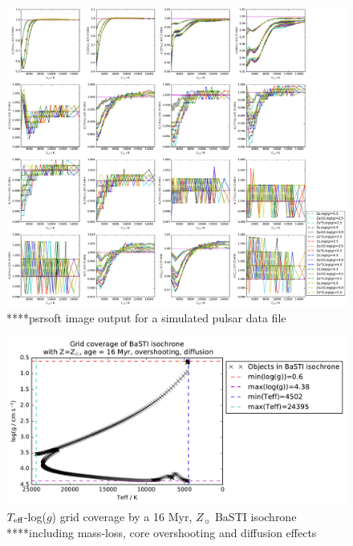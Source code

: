\documentclass[usenatbib]{mnras}
\begin{document}
\begin{figure}
\begin{center}
\includegraphics[scale=0.3]{../Aall_ratio_Zs_div_Z2_effect_high_logg_zoom_15000.pdf}
\caption{****psrsoft image output for a simulated pulsar data file}
\label{all_Z_Z2_ratio}
\end{center}
\end{figure}

\begin{figure}
\includegraphics[scale=0.4]{../wfc3_16_23Myr_10Gyr_complex_solar/wfc3_ATLAS9_grid_BaSTI_coverage_c16_complex_Zsol_4500.pdf}
\caption{$T_{\textnormal{eff}}$-log($g$) grid coverage by a 16 Myr, $Z_{\sun}$ BaSTI isochrone ****including mass-loss, core overshooting and diffusion effects}
\label{BaSTI_coverage_16M}
\end{figure}
\end{document}
